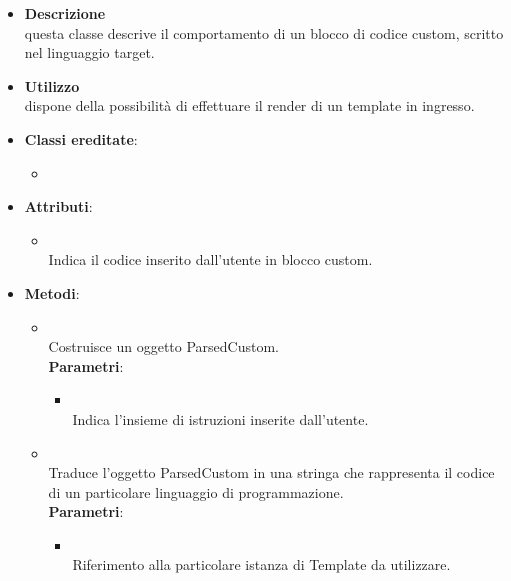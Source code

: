 \label{\nogloxy{swedesigner::server::project::ParsedCustom}}
\begin{figure}[h]
\centering
{}
\caption{}
\end{figure}
\FloatBarrier
\begin{itemize}
\item \textbf{Descrizione}\\
questa classe descrive il comportamento di un blocco di codice custom, scritto nel linguaggio target.	
\item \textbf{Utilizzo}\\
dispone della possibilità di effettuare il render di un template in ingresso.
\item \textbf{Classi ereditate}:
\begin{itemize}
\item \hyperref[\nogloxy{swedesigner::server::project::ParsedInstruction}]{}
\end{itemize}
\item \textbf{Attributi}:
\begin{itemize}
\item {}
\\ Indica il codice inserito dall'utente in blocco custom.
\end{itemize}
\item \textbf{Metodi}:
\begin{itemize}
\item {}
\\ Costruisce un oggetto ParsedCustom.
\\ \textbf{Parametri}:
\begin{itemize}
\item {}
\\ Indica l'insieme di istruzioni inserite dall'utente.
\end{itemize}
\item {}
\\ Traduce l'oggetto ParsedCustom in una stringa che rappresenta il codice di un particolare linguaggio di programmazione.
\\ \textbf{Parametri}:
\begin{itemize}
\item {}
\\ Riferimento alla particolare istanza di Template da utilizzare.
\end{itemize}
\end{itemize}
\end{itemize}

